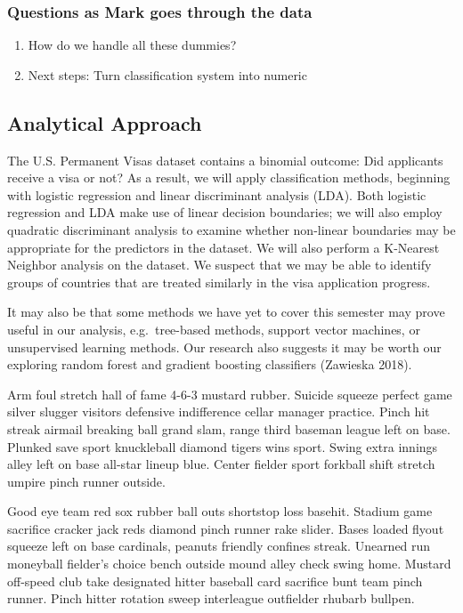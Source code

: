 \documentclass[]{article}
\providecommand{\tightlist}{%
  \setlength{\itemsep}{0pt}\setlength{\parskip}{0pt}}
\begin{document}
\subsubsection{Questions as Mark goes through the
data}\label{questions-as-mark-goes-through-the-data}

\begin{enumerate}
\def\labelenumi{\arabic{enumi}.}
\tightlist
\item
  How do we handle all these dummies?
\item
  Next steps: Turn classification system into numeric
\end{enumerate}

\subsection{Analytical Approach}\label{analytical-approach}

The U.S. Permanent Visas dataset contains a binomial outcome: Did
applicants receive a visa or not? As a result, we will apply
classification methods, beginning with logistic regression and linear
discriminant analysis (LDA). Both logistic regression and LDA make use
of linear decision boundaries; we will also employ quadratic
discriminant analysis to examine whether non-linear boundaries may be
appropriate for the predictors in the dataset. We will also perform a
K-Nearest Neighbor analysis on the dataset. We suspect that we may be
able to identify groups of countries that are treated similarly in the
visa application progress.

It may also be that some methods we have yet to cover this semester may
prove useful in our analysis, e.g.~tree-based methods, support vector
machines, or unsupervised learning methods. Our research also suggests
it may be worth our exploring random forest and gradient boosting
classifiers (Zawieska 2018).

Arm foul stretch hall of fame 4-6-3 mustard rubber. Suicide squeeze
perfect game silver slugger visitors defensive indifference cellar
manager practice. Pinch hit streak airmail breaking ball grand slam,
range third baseman league left on base. Plunked save sport knuckleball
diamond tigers wins sport. Swing extra innings alley left on base
all-star lineup blue. Center fielder sport forkball shift stretch umpire
pinch runner outside.

Good eye team red sox rubber ball outs shortstop loss basehit. Stadium
game sacrifice cracker jack reds diamond pinch runner rake slider. Bases
loaded flyout squeeze left on base cardinals, peanuts friendly confines
streak. Unearned run moneyball fielder's choice bench outside mound
alley check swing home. Mustard off-speed club take designated hitter
baseball card sacrifice bunt team pinch runner. Pinch hitter rotation
sweep interleague outfielder rhubarb bullpen.
\end{document}
